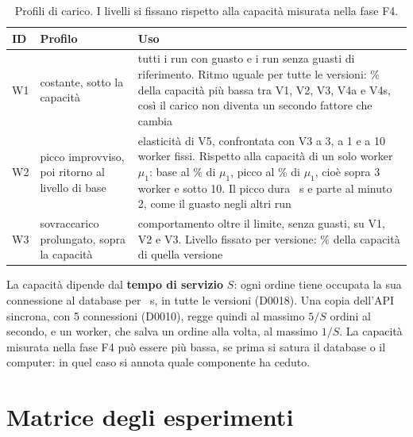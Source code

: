 \begin{table}[htbp]
\centering
\caption{Profili di carico. I livelli si fissano rispetto alla capacità misurata nella fase F4.}
\label{tab:carichi}
\begin{tabularx}{\linewidth}{@{}llL@{}}
\toprule
\textbf{ID} & \textbf{Profilo} & \textbf{Uso} \\
\midrule
W1 & costante, sotto la capacità & tutti i run con guasto e i run senza guasti di riferimento. Ritmo uguale per tutte le versioni: \% della capacità più bassa tra V1, V2, V3, V4a e V4s, così il carico non diventa un secondo fattore che cambia \\
W2 & picco improvviso, poi ritorno al livello di base & elasticità di V5, confrontata con V3 a 3, a 1 e a 10 worker fissi. Rispetto alla capacità di un solo worker $\mu_1$: base al \% di $\mu_1$, picco al \% di $\mu_1$, cioè sopra 3 worker e sotto 10. Il picco dura ~s e parte al minuto 2, come il guasto negli altri run \\
W3 & sovraccarico prolungato, sopra la capacità & comportamento oltre il limite, senza guasti, su V1, V2 e V3. Livello fissato per versione: \% della capacità di quella versione \\
\bottomrule
\end{tabularx}
\end{table}

La capacità dipende dal \textbf{tempo di servizio} $S$: ogni ordine tiene occupata la sua connessione al database per ~s, in tutte le versioni (D0018). Una copia dell'API sincrona, con 5 connessioni (D0010), regge quindi al massimo $5/S$ ordini al secondo, e un worker, che salva un ordine alla volta, al massimo $1/S$. La capacità misurata nella fase F4 può essere più bassa, se prima si satura il database o il computer: in quel caso si annota quale componente ha ceduto.

\section{Matrice degli esperimenti}

